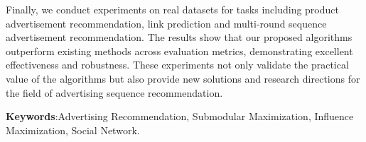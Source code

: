 Finally, we conduct experiments on real datasets for tasks including product advertisement recommendation, link  prediction and multi-round sequence advertisement recommendation. The results show that our proposed algorithms outperform existing methods across evaluation metrics, demonstrating excellent effectiveness and robustness. These experiments not only validate the practical value of the algorithms but also provide new solutions and research directions for the field of advertising sequence recommendation.

\textbf{Keywords}:Advertising Recommendation, Submodular Maximization, Influence Maximization, Social Network.